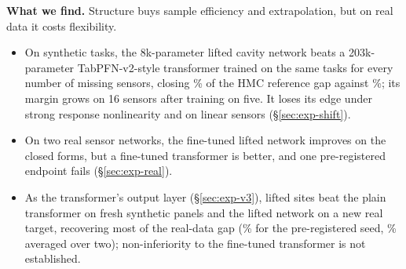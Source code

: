 \noindent\textbf{What we find.} Structure buys sample efficiency and extrapolation, but on real data it costs
flexibility.
\begin{itemize}
  \item On synthetic tasks, the 8k-parameter lifted cavity network beats a 203k-parameter TabPFN-v2-style transformer
  trained on the same tasks for every number of missing sensors, closing \GapliftOne\% of the HMC reference gap against
  \Gappfn\%; its margin grows on 16 sensors after training on five. It loses its edge under strong response
  nonlinearity and on linear sensors (\S\ref{sec:exp-shift}).
  \item On two real sensor networks, the fine-tuned lifted network improves on the closed forms, but a fine-tuned
  transformer is better, and one pre-registered endpoint fails (\S\ref{sec:exp-real}).
  \item As the transformer's output layer (\S\ref{sec:exp-v3}), lifted sites beat the plain transformer on fresh
  synthetic panels and the lifted network on a new real target, recovering most of the real-data gap
  (\VthreebeijingnoTwoeZerorecovered\% for the pre-registered seed, \Vthreeseedavgrecovered\% averaged over two);
  non-inferiority to the fine-tuned transformer is not established.
\end{itemize}
